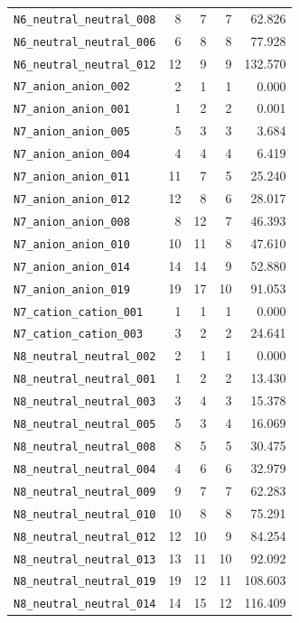 {\begin{longtable}{@{}p{4.0cm}rrrr@{}}
\texttt{N6\_neutral\_neutral\_008} & 8 & 7 & 7 & 62.826 \\
\texttt{N6\_neutral\_neutral\_006} & 6 & 8 & 8 & 77.928 \\
\texttt{N6\_neutral\_neutral\_012} & 12 & 9 & 9 & 132.570 \\
\addlinespace
\texttt{N7\_anion\_anion\_002} & 2 & 1 & 1 & 0.000 \\
\texttt{N7\_anion\_anion\_001} & 1 & 2 & 2 & 0.001 \\
\texttt{N7\_anion\_anion\_005} & 5 & 3 & 3 & 3.684 \\
\texttt{N7\_anion\_anion\_004} & 4 & 4 & 4 & 6.419 \\
\texttt{N7\_anion\_anion\_011} & 11 & 7 & 5 & 25.240 \\
\texttt{N7\_anion\_anion\_012} & 12 & 8 & 6 & 28.017 \\
\texttt{N7\_anion\_anion\_008} & 8 & 12 & 7 & 46.393 \\
\texttt{N7\_anion\_anion\_010} & 10 & 11 & 8 & 47.610 \\
\texttt{N7\_anion\_anion\_014} & 14 & 14 & 9 & 52.880 \\
\texttt{N7\_anion\_anion\_019} & 19 & 17 & 10 & 91.053 \\
\addlinespace
\texttt{N7\_cation\_cation\_001} & 1 & 1 & 1 & 0.000 \\
\texttt{N7\_cation\_cation\_003} & 3 & 2 & 2 & 24.641 \\
\addlinespace
\texttt{N8\_neutral\_neutral\_002} & 2 & 1 & 1 & 0.000 \\
\texttt{N8\_neutral\_neutral\_001} & 1 & 2 & 2 & 13.430 \\
\texttt{N8\_neutral\_neutral\_003} & 3 & 4 & 3 & 15.378 \\
\texttt{N8\_neutral\_neutral\_005} & 5 & 3 & 4 & 16.069 \\
\texttt{N8\_neutral\_neutral\_008} & 8 & 5 & 5 & 30.475 \\
\texttt{N8\_neutral\_neutral\_004} & 4 & 6 & 6 & 32.979 \\
\texttt{N8\_neutral\_neutral\_009} & 9 & 7 & 7 & 62.283 \\
\texttt{N8\_neutral\_neutral\_010} & 10 & 8 & 8 & 75.291 \\
\texttt{N8\_neutral\_neutral\_012} & 12 & 10 & 9 & 84.254 \\
\texttt{N8\_neutral\_neutral\_013} & 13 & 11 & 10 & 92.092 \\
\texttt{N8\_neutral\_neutral\_019} & 19 & 12 & 11 & 108.603 \\
\texttt{N8\_neutral\_neutral\_014} & 14 & 15 & 12 & 116.409 \\

\end{longtable}}
